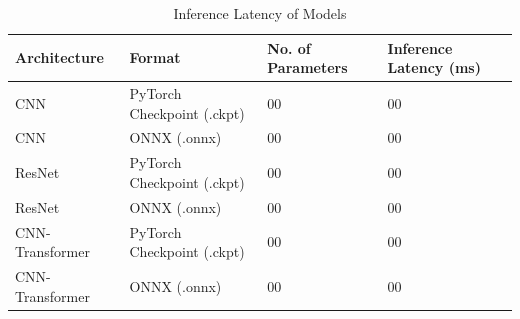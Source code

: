  \begin{table}[H]
\centering
\begin{tabular}{ l | L | L | L }
    
    Architecture  & 
    Format & 
    No. of Parameters &
    Inference Latency (ms) \\
    \hline
    
    CNN & 
    PyTorch Checkpoint (.ckpt)  & 
    00  &
    00  \\
    
    
    CNN & 
    ONNX (.onnx)  & 
    00  &
    00  \\
    
    ResNet & 
    PyTorch Checkpoint (.ckpt)  & 
    00  &
    00  \\
    
    
    ResNet & 
    ONNX (.onnx)  & 
    00  &
    00  \\
    
    CNN-Transformer & 
    PyTorch Checkpoint (.ckpt)  & 
    00  &
    00  \\
    
    
    CNN-Transformer & 
    ONNX (.onnx)  & 
    00  &
    00  \\

    \hline
   
\end{tabular}
    \caption{Inference Latency of Models}
    \label{tab:model_inference}
\end{table} %


